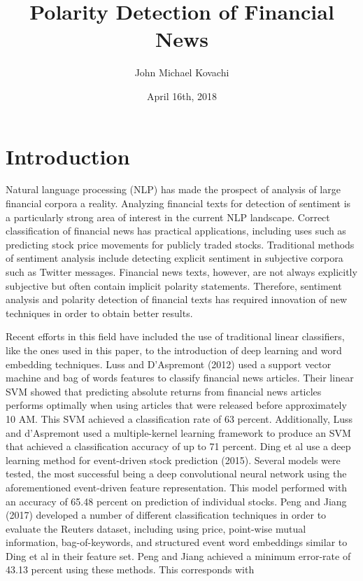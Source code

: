 \documentclass{article}
\title{Polarity Detection of Financial News}
\author{ John Michael Kovachi }
\date{April 16th, 2018}
\begin{document}
\maketitle

\section{Introduction}

    Natural language processing (NLP) has made the prospect of analysis of large financial corpora a reality. Analyzing financial texts for detection of sentiment is a particularly strong area of interest in the current NLP landscape. Correct classification of financial news has practical applications, including uses such as predicting stock price movements for publicly traded stocks. Traditional methods of sentiment analysis include detecting explicit sentiment in subjective corpora such as Twitter messages. Financial news texts, however, are not always explicitly subjective but often contain implicit polarity statements. Therefore, sentiment analysis and polarity detection of financial texts has required innovation of new techniques in order to obtain better results. 
    
    Recent efforts in this field have included the use of traditional linear classifiers, like the ones used in this paper, to the introduction of deep learning and word embedding techniques. Luss and D'Aspremont (2012) used a support vector machine and bag of words features to classify financial news articles. Their linear SVM showed that predicting absolute returns from financial news articles performs optimally when using articles that were released before approximately 10 AM. This SVM achieved a classification rate of 63 percent. Additionally, Luss and d'Aspremont used a multiple-kernel learning framework to produce an SVM that achieved a classification accuracy of up to 71 percent. Ding et al use a deep learning method for event-driven stock prediction (2015). Several models were tested, the most successful being a deep convolutional neural network using the aforementioned event-driven feature representation. This model performed with an accuracy of 65.48 percent on prediction of individual stocks. Peng and Jiang (2017) developed a number of different classification techniques in order to evaluate the Reuters dataset, including using price, point-wise mutual information, bag-of-keywords, and structured event word embeddings similar to Ding et al in their feature set. Peng and Jiang achieved a minimum error-rate of 43.13 percent using these methods. This corresponds with 
        
\end{document}
